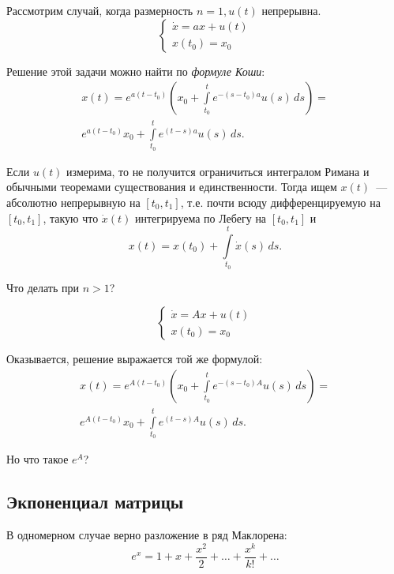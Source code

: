 Рассмотрим случай, когда размерность $n = 1, u(t)$ непрерывна.
\begin{equation*}
    \begin{cases}
        \dot{x} = ax + u(t) \\
        x(t_0) = x_0
    \end{cases}
\end{equation*}

Решение этой задачи можно найти по \textit{формуле Коши}:
\begin{gather*}
    x(t) = e^{a(t - t_0)} \left( x_0 + \int\limits_{t_0}^{t} e^{-(s - t_0)a} u(s) \, ds\right) = \\
    e^{a(t - t_0)} x_0 + \int\limits_{t_0}^{t} e^{(t - s)a} u(s) \, ds.
\end{gather*}

Если $u(t)$ измерима, то не получится ограничиться интегралом Римана и обычными теоремами существования и единственности.
Тогда ищем $x(t)$~--- абсолютно непрерывную на $[t_0, t_1]$, т.е. почти всюду дифференцируемую на $[t_0, t_1]$, такую что
$\dot{x}(t)$ интегрируема по Лебегу на $[t_0, t_1]$ и 
\begin{equation*}
    x(t) = x(t_0) + \int\limits_{t_0}^{t} \dot{x}(s) \, ds.
\end{equation*}

Что делать при $n > 1$?

\begin{equation*}
    \begin{cases}
        \dot{x} = Ax + u(t) \\
        x(t_0) = x_0
    \end{cases}
\end{equation*}

Оказывается, решение выражается той же формулой:
\begin{gather*}
    x(t) = e^{A(t - t_0)} \left( x_0 + \int\limits_{t_0}^{t} e^{-(s - t_0)A} u(s) \, ds\right) = \\
    e^{A(t - t_0)} x_0 + \int\limits_{t_0}^{t} e^{(t - s)A} u(s) \, ds.
\end{gather*}

Но что такое $e^{A}$?

\subsection{Экпоненциал матрицы}

В одномерном случае верно разложение в ряд Маклорена:
\begin{equation*}
    e^x = 1 + x + \frac{x^2}{2} + \ldots + \frac{x^k}{k!} + \ldots 
\end{equation*}


